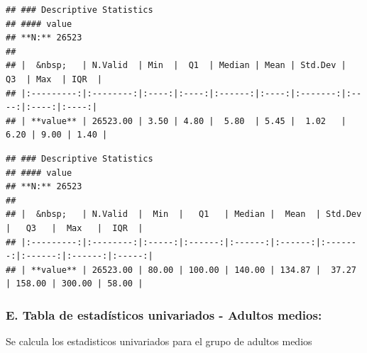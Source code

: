 \documentclass[
]{article}
\newenvironment{Shaded}{\begin{snugshade}}{\end{snugshade}}
\newcommand{\AttributeTok}[1]{\textcolor[rgb]{0.13,0.29,0.53}{#1}}
\newcommand{\ConstantTok}[1]{\textcolor[rgb]{0.56,0.35,0.01}{#1}}
\newcommand{\FunctionTok}[1]{\textcolor[rgb]{0.13,0.29,0.53}{\textbf{#1}}}
\newcommand{\NormalTok}[1]{#1}
\newcommand{\SpecialCharTok}[1]{\textcolor[rgb]{0.81,0.36,0.00}{\textbf{#1}}}
\newcommand{\StringTok}[1]{\textcolor[rgb]{0.31,0.60,0.02}{#1}}
\begin{document}
\begin{verbatim}
## ### Descriptive Statistics  
## #### value  
## **N:** 26523  
## 
## |  &nbsp;   | N.Valid  | Min  |  Q1  | Median | Mean | Std.Dev |  Q3  | Max  | IQR  |
## |:---------:|:--------:|:----:|:----:|:------:|:----:|:-------:|:----:|:----:|:----:|
## | **value** | 26523.00 | 3.50 | 4.80 |  5.80  | 5.45 |  1.02   | 6.20 | 9.00 | 1.40 |
\end{verbatim}

\begin{Shaded}
\end{Shaded}

\begin{verbatim}
## ### Descriptive Statistics  
## #### value  
## **N:** 26523  
## 
## |  &nbsp;   | N.Valid  |  Min  |   Q1   | Median |  Mean  | Std.Dev |   Q3   |  Max   |  IQR  |
## |:---------:|:--------:|:-----:|:------:|:------:|:------:|:-------:|:------:|:------:|:-----:|
## | **value** | 26523.00 | 80.00 | 100.00 | 140.00 | 134.87 |  37.27  | 158.00 | 300.00 | 58.00 |
\end{verbatim}

\hypertarget{e.-tabla-de-estaduxedsticos-univariados---adultos-medios}{%
\subsubsection{\texorpdfstring{\textbf{E. Tabla de estadísticos
univariados - Adultos
medios:}}{E. Tabla de estadísticos univariados - Adultos medios:}}\label{e.-tabla-de-estaduxedsticos-univariados---adultos-medios}}

Se calcula los estadisticos univariados para el grupo de adultos medios
\end{document}
